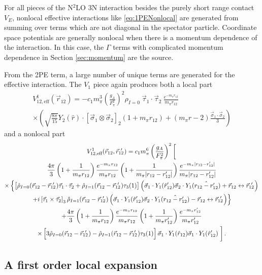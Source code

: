 \documentclass[%
 preprint,
 amsmath,amssymb,
 aps,
]{revtex4-1}
\newcommand{\yukawadimless}[1]{\frac{e^{-m_\pi #1}}{m_\pi #1}}
\newcommand{\rot}{\vec{r}_{12}}
\newcommand{\rotp}{\vec{r}_{12}\!\!\!'\;}
\newcommand{\taudot}{\vec{\tau}_1\cdot\vec{\tau}_2}
\newcommand{\taucrossthree}{\left[\vec{\tau}_1\times\vec{\tau}_2\right]_3}
\newcommand{\sigmadot}{\vec{\sigma}_1\cdot\vec{\sigma}_2}
\newcommand{\sigmatwo}{[\vec{\sigma}_1\otimes\vec{\sigma}_2]_2}
\begin{document}
For all pieces of the N$^2$LO 3N interaction besides the purely short range contact $V_E$, nonlocal effective interactions like \eqref{eq:1PENonlocal} are generated from summing over terms which are not diagonal in the spectator particle. Coordinate space potentials are generally nonlocal when there is a momentum dependence of the interaction. In this case, the $\Gamma$ terms with complicated momentum dependence in Section \ref{sec:momentum} are the source.

From the 2PE term, a large number of unique terms are generated for the effective interaction. The $V_1$ piece again produces both a local part 
\begin{multline}
V^{1}_{12,\text{eff}}(\rot)=-c_1 m_\pi^3\left(\frac{g_A}{F_\pi^2}\right)^2 \rho_{I=0}\: \taudot\: \yukawadimless{r_{12}}\\
 \times\left(\sqrt{\frac{8\pi}{15}}Y_2(\hat{r})\cdot\sigmatwo (1+m_\pi r_{12})+(m_\pi r-2)\frac{\sigmadot}{3}\right)
\end{multline}
and a nonlocal part 
\begin{multline}
V^{1}_{12,\text{eff}}(\rot,\rotp)=c_1 m_\pi^6\left(\frac{g_A}{F_\pi^2}\right)^2 \left[\vphantom{\frac{1}{3}}\right. \\
  \frac{4\pi}{3}\left(1+\frac{1}{m_\pi r_{12}}\right)\yukawadimless{r_{12}}\left(1+\frac{1}{m_\pi |r_{12}-r_{12}'|}\right)\yukawadimless{|r_{12}-r'_{12}|} \\
   \times\left\{\left[\vphantom{x^{i}}
   \hat{\rho}_{I=0}(\rot-\rotp) \taudot+\hat{\rho}_{I=1}(\rot-\rotp)\tau_3(1)\right]
   \left(\vec{\sigma}_1\cdot Y_{1}(\hat{r}'_{12})\vec{\sigma}_2\cdot Y_{1}(\hat{r_{12}-r'_{12}})+\rot\leftrightarrow\rotp\right) \right.\\
\left.+i\taucrossthree\hat{\rho}_{I=1}(\rot-\rotp)\left(\vec{\sigma}_1\cdot Y_{1}(\hat{r}'_{12})\vec{\sigma}_2\cdot Y_{1}(\hat{r_{12}-r'_{12}})-\rot\leftrightarrow\rotp\right)\right\} \\
+ \frac{4\pi}{3}\left(1+\frac{1}{m_\pi r_{12}}\right)\yukawadimless{r_{12}}\left(1+\frac{1}{m_\pi r'_{12}}\right)\yukawadimless{r'_{12}} \\
\times \left[3\vphantom{x^{i^i}}\hat{\rho}_{I=0}(\rot-\rotp)-\hat{\rho}_{I=1}(\rot-\rotp)\tau_3(1)\right]\vec{\sigma}_1\cdot Y_{1}(\hat{r}_{12})\vec{\sigma}_1\cdot Y_{1}(\hat{r}'_{12})\left.\vphantom{\frac{1}{3}}\right].
\end{multline}


\subsection{A first order local expansion}
\end{document}
